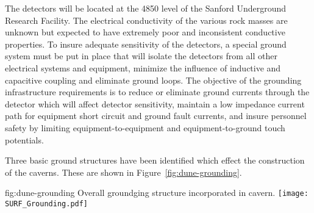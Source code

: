 The detectors will be located at the 4850 level of the Sanford
Underground Research Facility. The electrical conductivity of the
various rock masses are unknown but expected to have extremely poor
and inconsistent conductive properties. To insure adequate sensitivity
of the detectors, a special ground system must be put in place that
will isolate the detectors from all other electrical systems and
equipment, minimize the influence of inductive and capacitive coupling
and eliminate ground loops. The objective of the grounding
infrastructure requirements is to reduce or eliminate ground currents
through the detector which will affect detector sensitivity, maintain
a low impedance current path for equipment short circuit and ground
fault currents, and insure personnel safety by limiting
equipment-to-equipment and equipment-to-ground touch potentials.

Three basic ground structures have been identified which effect the
construction of the caverns.  These are shown in
Figure~\ref{fig:dune-grounding}.
\begin{dunefigure}{fig:dune-grounding}
  {Overall  groundging structure incorporated in cavern.}
  \texttt{[image: SURF\_Grounding.pdf]}
\end{dunefigure}

